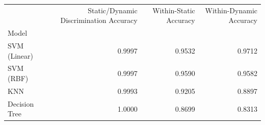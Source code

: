 \begin{tabular}{lrrr}
\toprule
 & Static/Dynamic Discrimination Accuracy & Within-Static Accuracy & Within-Dynamic Accuracy \\
Model &  &  &  \\
\midrule
SVM (Linear) & 0.9997 & 0.9532 & 0.9712 \\
SVM (RBF) & 0.9997 & 0.9590 & 0.9582 \\
KNN & 0.9993 & 0.9205 & 0.8897 \\
Decision Tree & 1.0000 & 0.8699 & 0.8313 \\
\bottomrule
\end{tabular}
